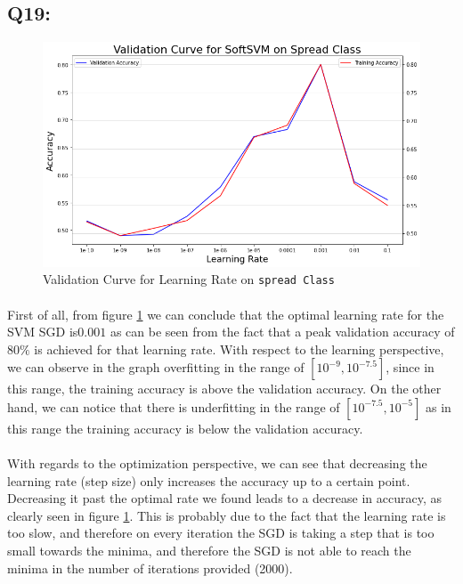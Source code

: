 \documentclass{article}
\newcommand{\code}[1]{\texttt{#1}}
\begin{document}
\subsection*{Q19:}
    \begin{figure}[H]
        \centering
        \includegraphics[scale=0.48]{q19.png}
        \caption{Validation Curve for Learning Rate on \code{spread Class}}
        \label{fig:q19}
    \end{figure}
    \paragraph*{}
    First of all, from figure \ref{fig:q19} we can conclude that the optimal learning rate for the SVM SGD is$0.001$ as can be seen from the fact that a peak validation accuracy of $80\%$ is achieved for that learning rate.
    With respect to the learning perspective, we can observe in the graph overfitting in the range of $[10^{-9}, 10^{-7.5}]$, since in this range, the training accuracy is above the validation accuracy. On the other hand, we can notice that there is underfitting in the range of $[10^{-7.5}, 10^{-5}]$ as in this range the training accuracy is below the validation accuracy.
    \paragraph*{}
    With regards to the optimization perspective, we can see that decreasing the learning rate (step size) only increases the accuracy up to a certain point. Decreasing it past the optimal rate we found leads to a decrease in accuracy, as clearly seen in figure \ref{fig:q19}. This is probably due to the fact that the learning rate is too slow, and therefore on every iteration the SGD is taking a step that is too small towards the minima, and therefore the SGD is not able to reach the minima in the number of iterations provided (2000).
\end{document}
